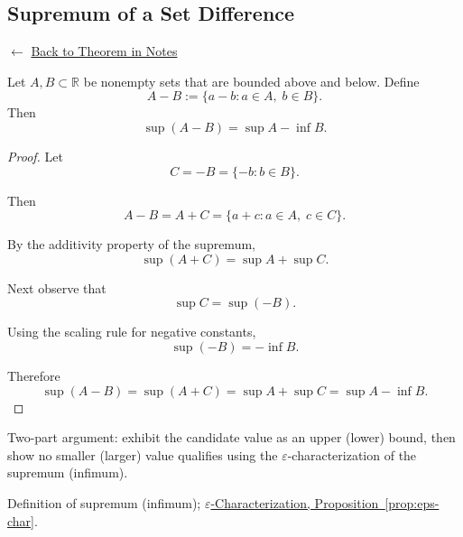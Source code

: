 
\subsection*{Supremum of a Set Difference}
\label{prf:supremum-set-difference}

\begin{remark*}[Return]
$\leftarrow$ \hyperref[thm:sup-diff]{Back to Theorem in Notes}
\end{remark*}

\begin{theorem*}
Let $A,B \subset \mathbb{R}$ be nonempty sets that are bounded above and below.
Define
\[
A-B := \{a-b : a\in A,\; b\in B\}.
\]
Then
\[
\sup(A-B) = \sup A - \inf B.
\]
\end{theorem*}

\begin{proof}
Let
\[
C = -B = \{-b : b\in B\}.
\]

Then
\[
A-B = A + C = \{a+c : a\in A,\; c\in C\}.
\]

By the additivity property of the supremum,
\[
\sup(A+C) = \sup A + \sup C.
\]

Next observe that
\[
\sup C = \sup(-B).
\]

Using the scaling rule for negative constants,
\[
\sup(-B) = -\inf B.
\]

Therefore
\[
\sup(A-B)
=
\sup(A+C)
=
\sup A + \sup C
=
\sup A - \inf B.
\]
\end{proof}

\begin{remark*}
Two-part argument: exhibit the candidate value as an upper (lower) bound,
then show no smaller (larger) value qualifies using the
$\varepsilon$-characterization of the supremum (infimum).
\end{remark*}

\begin{remark*}[Dependencies]
Definition of supremum (infimum); \hyperref[prop:eps-char]{$\varepsilon$-Characterization, Proposition~\ref*{prop:eps-char}}.
\end{remark*}

